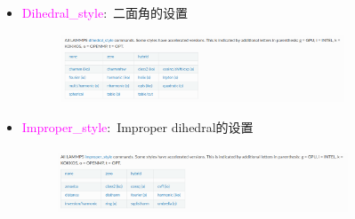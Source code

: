 \frame
{
	\frametitle{}
	\begin{itemize}
		\item \textcolor{magenta}{Dihedral\_style}:~二面角的设置
\begin{figure}[h!]
\centering
\vspace*{-0.10in}
\includegraphics[height=0.8in,width=3.4in,viewport=0 0 1100 290,clip]{Figures/LAMMPS-dihedral_style-command.png}
\label{LAMMPS-dihedral_style}
\end{figure}
		\item \textcolor{magenta}{Improper\_style}:~\textrm{Improper dihedral}的设置
\begin{figure}[h!]
\centering
\vspace*{-0.10in}
\includegraphics[height=0.8in,width=3.4in,viewport=0 0 1100 280,clip]{Figures/LAMMPS-improper_dihedral-command.png}
\label{LAMMPS-improper_dihedral}
\end{figure}
	\end{itemize}
}

